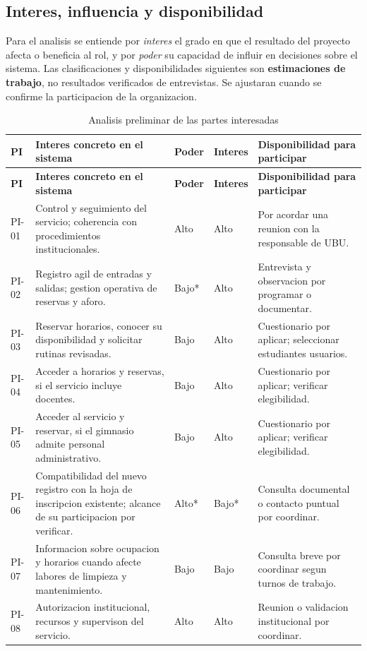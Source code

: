 \subsection{Interes, influencia y disponibilidad}
Para el analisis se entiende por \emph{interes} el grado en que el resultado del proyecto afecta o beneficia al rol, y por \emph{poder} su capacidad de influir en decisiones sobre el sistema. Las clasificaciones y disponibilidades siguientes son \textbf{estimaciones de trabajo}, no resultados verificados de entrevistas. Se ajustaran cuando se confirme la participacion de la organizacion.

\begingroup
\footnotesize
\renewcommand{\arraystretch}{1.18}
\begin{longtable}{|p{1.0cm}|p{4.65cm}|p{1.2cm}|p{1.25cm}|p{4.65cm}|}
\caption{Analisis preliminar de las partes interesadas}\label{tab:analisis-pi}\\\hline
\textbf{PI} & \textbf{Interes concreto en el sistema} & \textbf{Poder} & \textbf{Interes} & \textbf{Disponibilidad para participar} \\ \hline
\endfirsthead
\hline \textbf{PI} & \textbf{Interes concreto en el sistema} & \textbf{Poder} & \textbf{Interes} & \textbf{Disponibilidad para participar} \\ \hline
\endhead
PI-01 & Control y seguimiento del servicio; coherencia con procedimientos institucionales. & Alto & Alto & Por acordar una reunion con la responsable de UBU. \\ \hline
PI-02 & Registro agil de entradas y salidas; gestion operativa de reservas y aforo. & Bajo* & Alto & Entrevista y observacion por programar o documentar. \\ \hline
PI-03 & Reservar horarios, conocer su disponibilidad y solicitar rutinas revisadas. & Bajo & Alto & Cuestionario por aplicar; seleccionar estudiantes usuarios. \\ \hline
PI-04 & Acceder a horarios y reservas, si el servicio incluye docentes. & Bajo & Alto & Cuestionario por aplicar; verificar elegibilidad. \\ \hline
PI-05 & Acceder al servicio y reservar, si el gimnasio admite personal administrativo. & Bajo & Alto & Cuestionario por aplicar; verificar elegibilidad. \\ \hline
PI-06 & Compatibilidad del nuevo registro con la hoja de inscripcion existente; alcance de su participacion por verificar. & Alto* & Bajo* & Consulta documental o contacto puntual por coordinar. \\ \hline
PI-07 & Informacion sobre ocupacion y horarios cuando afecte labores de limpieza y mantenimiento. & Bajo & Bajo & Consulta breve por coordinar segun turnos de trabajo. \\ \hline
PI-08 & Autorizacion institucional, recursos y supervison del servicio. & Alto & Alto & Reunion o validacion institucional por coordinar. \\ \hline
\end{longtable}
\endgroup


